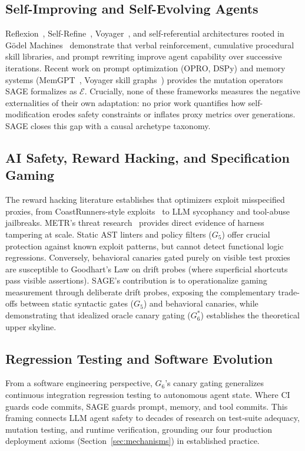 \documentclass[conference]{IEEEtran}
\begin{document}
\subsection{Self-Improving and Self-Evolving Agents}
Reflexion~\cite{shinn2024reflexion}, Self-Refine~\cite{madaan2023selfrefine}, Voyager~\cite{wang2023voyager}, and self-referential architectures rooted in G{\"o}del Machines~\cite{schmidhuber2007godel} demonstrate that verbal reinforcement, cumulative procedural skill libraries, and prompt rewriting improve agent capability over successive iterations. Recent work on prompt optimization (OPRO, DSPy) and memory systems (MemGPT~\cite{packer2023memgpt}, Voyager skill graphs~\cite{wang2023voyager}) provides the mutation operators SAGE formalizes as $\mathcal{E}$. Crucially, none of these frameworks measures the negative externalities of their own adaptation: no prior work quantifies how self-modification erodes safety constraints or inflates proxy metrics over generations. SAGE closes this gap with a causal archetype taxonomy.

\subsection{AI Safety, Reward Hacking, and Specification Gaming}
The reward hacking literature establishes that optimizers exploit misspecified proxies, from CoastRunners-style exploits~\cite{amodei2016concrete,leike2018scalable} to LLM sycophancy and tool-abuse jailbreaks. METR's threat research~\cite{metr2024evaluating,metr2026risk} provides direct evidence of harness tampering at scale. Static AST linters and policy filters ($G_5$) offer crucial protection against known exploit patterns, but cannot detect functional logic regressions. Conversely, behavioral canaries gated purely on visible test proxies are susceptible to Goodhart's Law on drift probes (where superficial shortcuts pass visible assertions). SAGE's contribution is to operationalize gaming measurement through deliberate drift probes, exposing the complementary trade-offs between static syntactic gates ($G_5$) and behavioral canaries, while demonstrating that idealized oracle canary gating ($G_6^*$) establishes the theoretical upper skyline.

\subsection{Regression Testing and Software Evolution}
From a software engineering perspective, $G_6$'s canary gating generalizes continuous integration regression testing to autonomous agent state. Where CI guards code commits, SAGE guards prompt, memory, and tool commits. This framing connects LLM agent safety to decades of research on test-suite adequacy, mutation testing, and runtime verification, grounding our four production deployment axioms (Section~\ref{sec:mechanisms}) in established practice.
\end{document}
